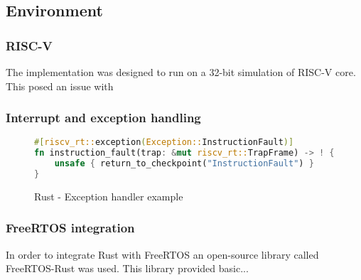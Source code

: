 \subsection{Environment}

\subsubsection{RISC-V}

The implementation was designed to run on a 32-bit simulation of RISC-V core. This posed an issue with 

\subsubsection{Interrupt and exception handling} \label{sec:riscv_exception_handling}

\begin{figure}[h!]
\begin{lstlisting}[language=Rust]
#[riscv_rt::exception(Exception::InstructionFault)]
fn instruction_fault(trap: &mut riscv_rt::TrapFrame) -> ! {
    unsafe { return_to_checkpoint("InstructionFault") }
}
\end{lstlisting}
\caption{Rust - Exception handler example}
\label{fig:rust_exception_handler}
\end{figure}

\subsubsection{FreeRTOS integration}

In order to integrate Rust with FreeRTOS an open-source library called FreeRTOS-Rust was used. This library provided basic... 